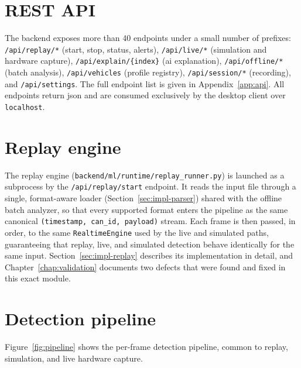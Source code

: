 \section{REST API}

The backend exposes more than 40 endpoints under a small number of prefixes: \texttt{/api/replay/*} (start, stop, status, alerts), \texttt{/api/live/*} (simulation and hardware capture), \texttt{/api/explain/\{index\}} (\gls{ai} explanation), \texttt{/api/offline/*} (batch analysis), \texttt{/api/vehicles} (profile registry), \texttt{/api/session/*} (recording), and \texttt{/api/settings}. The full endpoint list is given in Appendix~\ref{app:api}. All endpoints return \gls{json} and are consumed exclusively by the desktop client over \texttt{localhost}.

\section{Replay engine}
\label{sec:design-replay}

The replay engine (\texttt{backend/ml/runtime/replay\_runner.py}) is launched as a subprocess by the \texttt{/api/replay/start} endpoint. It reads the input file through a single, format-aware loader (Section~\ref{sec:impl-parser}) shared with the offline batch analyzer, so that every supported format enters the pipeline as the same canonical \texttt{(timestamp, can\_id, payload)} stream. Each frame is then passed, in order, to the same \texttt{RealtimeEngine} used by the live and simulated paths, guaranteeing that replay, live, and simulated detection behave identically for the same input. Section~\ref{sec:impl-replay} describes its implementation in detail, and Chapter~\ref{chap:validation} documents two defects that were found and fixed in this exact module.

\section{Detection pipeline}
\label{sec:design-pipeline}

Figure~\ref{fig:pipeline} shows the per-frame detection pipeline, common to replay, simulation, and live hardware capture.

